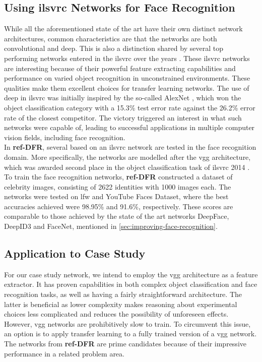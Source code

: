 \subsection{Using \acrshort{ilsvrc} Networks for Face Recognition}

While all the aforementioned state of the art  have their own distinct network architectures, common characteristics are that the networks are both convolutional and deep. This is also a distinction shared by several top performing networks entered in the \acrfull{ilsvrc} \cite{imagenet} over the years \cite{inception, vgg, googlenet}. These \acrshort{ilsvrc} networks are interesting because of their powerful feature extracting capabilities and performance on varied object recognition in unconstrained environments. These qualities make them excellent choices for transfer learning networks. The use of deep  in \acrshort{ilsvrc} was initially inspired by the so-called AlexNet \cite{alexnet}, which won the object classification category with a 15.3\% test error rate against the 26.2\% error rate of the closest competitor. The victory triggered an interest in what such networks were capable of, leading to successful applications in multiple computer vision fields, including face recognition. \\

\noindent In \textbf{ref-DFR}, several  based on an \acrshort{ilsvrc} network are tested in the face recognition domain. More specifically, the networks are modelled after the \acrfull{vgg} architecture, which was awarded second place in the object classification task of \acrshort{ilsvrc} 2014 \cite{vgg}. To train the face recognition networks, \textbf{ref-DFR} constructed a dataset of celebrity images, consisting of 2622 identities with 1000 images each. The networks were tested on \acrshort{lfw} and YouTube Faces Dataset, where the best accuracies achieved were 98.95\% and 91.6\%, respectively. These scores are comparable to those achieved by the state of the art networks DeepFace, DeepID3 and FaceNet, mentioned in \autoref{sec:improving-face-recognition}.

\subsection{Application to Case Study} \label{sec:vggface-application}

For our case study network, we intend to employ the \acrshort{vgg} architecture as a feature extractor. It has proven capabilities in both complex object classification and face recognition tasks, as well as having a fairly straightforward architecture. The latter is beneficial as lower complexity makes reasoning about experimental choices less complicated and reduces the possibility of unforeseen effects. However, \acrshort{vgg} networks are prohibitively slow to train. To circumvent this issue, an option is to apply transfer learning to a fully trained version of a \acrshort{vgg} network. The networks from \textbf{ref-DFR} are prime candidates because of their impressive performance in a related problem area.

\cleardoublepage